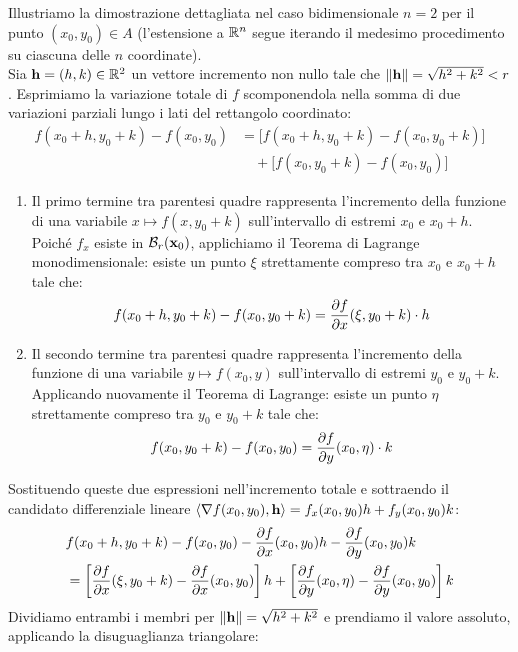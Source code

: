 \begin{dimostrazione}
Illustriamo la dimostrazione dettagliata nel caso bidimensionale $n=2$ per il punto $(x_0, y_0) \in A$ (l'estensione a $\mathbb{R}^n$ segue iterando il medesimo procedimento su ciascuna delle $n$ coordinate).\\
Sia $\mathbf{h} = (h, k) \in \mathbb{R}^2$ un vettore incremento non nullo tale che $\lVert\mathbf{h}\rVert = \sqrt{h^2+k^2} < r$.
Esprimiamo la variazione totale di $f$ scomponendola nella somma di due variazioni parziali lungo i lati del rettangolo coordinato:
\begin{align*}
f(x_0 + h, y_0 + k) - f(x_0, y_0) &= \Big[ f(x_0 + h, y_0 + k) - f(x_0, y_0 + k) \Big] \\
&\quad + \Big[ f(x_0, y_0 + k) - f(x_0, y_0) \Big]
\end{align*}
\begin{enumerate}
    \item Il primo termine tra parentesi quadre rappresenta l'incremento della funzione di una variabile $x \mapsto f(x, y_0 + k)$ sull'intervallo di estremi $x_0$ e $x_0+h$. Poiché $f_x$ esiste in $\mathcal{B}_r(\mathbf{x}_0)$, applichiamo il Teorema di Lagrange monodimensionale: esiste un punto $\xi$ strettamente compreso tra $x_0$ e $x_0+h$ tale che:
    \[
    f(x_0 + h, y_0 + k) - f(x_0, y_0 + k) = \frac{\partial f}{\partial x}(\xi, y_0 + k) \cdot h
    \]
    \item Il secondo termine tra parentesi quadre rappresenta l'incremento della funzione di una variabile $y \mapsto f(x_0, y)$ sull'intervallo di estremi $y_0$ e $y_0+k$. Applicando nuovamente il Teorema di Lagrange: esiste un punto $\eta$ strettamente compreso tra $y_0$ e $y_0+k$ tale che:
    \[
    f(x_0, y_0 + k) - f(x_0, y_0) = \frac{\partial f}{\partial y}(x_0, \eta) \cdot k
    \]
\end{enumerate}
Sostituendo queste due espressioni nell'incremento totale e sottraendo il candidato differenziale lineare $\langle\nabla f(x_0, y_0), \mathbf{h}\rangle = f_x(x_0, y_0) h + f_y(x_0, y_0) k$:
\begin{align*}
&f(x_0 + h, y_0 + k) - f(x_0, y_0) - \frac{\partial f}{\partial x}(x_0, y_0) h - \frac{\partial f}{\partial y}(x_0, y_0) k \\
&= \left[ \frac{\partial f}{\partial x}(\xi, y_0 + k) - \frac{\partial f}{\partial x}(x_0, y_0) \right] h + \left[ \frac{\partial f}{\partial y}(x_0, \eta) - \frac{\partial f}{\partial y}(x_0, y_0) \right] k
\end{align*}
Dividiamo entrambi i membri per $\lVert\mathbf{h}\rVert = \sqrt{h^2+k^2}$ e prendiamo il valore assoluto, applicando la disuguaglianza triangolare:
\begin{align*}

\end{align*}
\end{dimostrazione}
